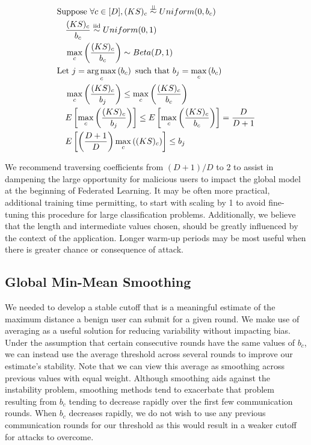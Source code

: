 \documentclass{article} %
\newcommand{\indep}{\perp \!\!\! \perp}
\begin{document}
\begin{align}
    & \textrm{Suppose } \forall c \in \mathopen[ D \mathclose], (KS)_c \overset{\indep}{\sim} Uniform(0, b_c) \nonumber \\
    & \quad \dfrac{(KS)_c}{b_c} \overset{\mathrm{iid}}{\sim} Uniform(0, 1) \nonumber \\
    & \quad \max_c \left( \dfrac{(KS)_c}{b_c} \right) \sim Beta(D, 1) \nonumber \\
    & \textrm{Let } j = \argmax_c \left( b_c \right) \textrm{ such that } b_j = \max_c \left( b_c \right) \nonumber \\
    & \quad \max_c \left( \dfrac{(KS)_c}{b_j} \right) \leq \max_c \left( \dfrac{(KS)_c}{b_c} \right) \nonumber \\
    & \quad E \left[ \max_c \left( \dfrac{(KS)_c}{b_j} \right) \right] \leq E \left[ \max_c \left( \dfrac{(KS)_c}{b_c} \right) \right] = \dfrac{D}{D + 1} \nonumber \\
    & \quad E \left[ \left( \dfrac{D + 1}{D} \right) \max_c \left( (KS)_c \right) \right] \leq b_j \label{eq:leq_bound}
\end{align}

We recommend traversing coefficients from $(D + 1) / D$ to 2 to assist in dampening the large opportunity for malicious users to impact the global model at the beginning of Federated Learning. It may be often more practical, additional training time permitting, to start with scaling by 1 to avoid fine-tuning this procedure for large classification problems. Additionally, we believe that the length and intermediate values chosen, should be greatly influenced by the context of the application. Longer warm-up periods may be most useful when there is greater chance or consequence of attack.


%
\subsection{Global Min-Mean Smoothing}

We needed to develop a stable cutoff that is a meaningful estimate of the maximum distance a benign user can submit for a given round. We make use of averaging as a useful solution for reducing variability without impacting bias. Under the assumption that certain consecutive rounds have the same values of $b_c$, we can instead use the average threshold across several rounds to improve our estimate's stability. Note that we can view this average as smoothing across previous values with equal weight. Although smoothing aids against the instability problem, smoothing methods tend to exacerbate that problem resulting from $b_c$ tending to decrease rapidly over the first few communication rounds. When $b_c$ decreases rapidly, we do not wish to use any previous communication rounds for our threshold as this would result in a weaker cutoff for attacks to overcome. 
\end{document}
